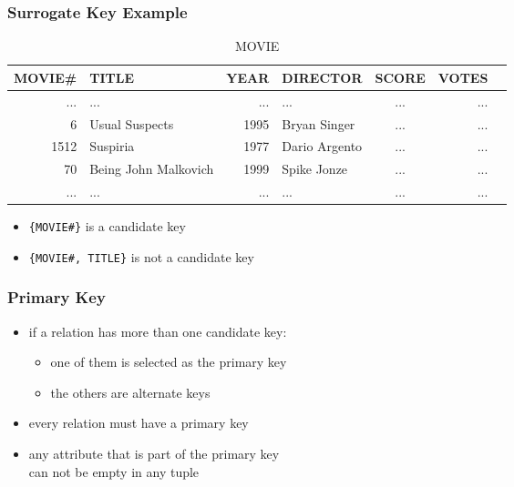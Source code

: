 \documentclass[dvipsnames]{beamer}
\theoremstyle{plain}
\begin{document}
\begin{frame}
  \frametitle{Surrogate Key Example}

  \begin{example}
    \begin{tiny}
    \begin{table}
      \caption{MOVIE}
      \begin{tabular}{|r|l|r|l|c|r|r|}\hline
MOVIE\# & TITLE                & YEAR & DIRECTOR      & SCORE & VOTES\\\hline\hline
    ... & ...                  &  ... & ...           & ...   &   ...\\\hline
      6 & Usual Suspects       & 1995 & Bryan Singer  & ...   &   ...\\\hline
   1512 & Suspiria             & 1977 & Dario Argento & ...   &   ...\\\hline
     70 & Being John Malkovich & 1999 & Spike Jonze   & ...   &   ...\\\hline
    ... & ...                  &  ... & ...           & ...   &   ...\\\hline
      \end{tabular}
    \end{table}
    \end{tiny}

    \pause
    \begin{itemize}
      \item \texttt{\{MOVIE\#\}} is a candidate key
      \item \texttt{\{MOVIE\#, TITLE\}} is not a candidate key
    \end{itemize}
  \end{example}
\end{frame}

\begin{frame}
  \frametitle{Primary Key}

  \begin{itemize}
    \item if a relation has more than one candidate key:
    \begin{itemize}
      \item one of them is selected as the \alert{primary key}
      \item the others are \alert{alternate keys}
    \end{itemize}

    \pause
    \item every relation must have a primary key

    \pause
    \item any attribute that is part of the primary key\\
      can not be empty in any tuple
  \end{itemize}
\end{frame}
\end{document}
